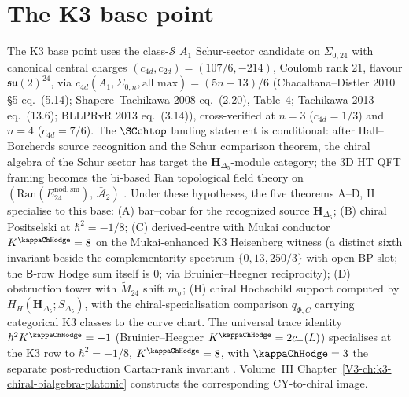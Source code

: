 \section*{The K3 base point}

The K3 base point uses the class-$\mathcal S$ \(A_1\) Schur-sector
candidate on \(\Sigma_{0,24}\) with canonical central charges
$(c_{4d}, c_{2d}) = (107/6, -214)$, Coulomb rank $21$, flavour
$\mathfrak{su}(2)^{24}$, via
$c_{4d}(A_1, \Sigma_{0,n}, \text{all max}) = (5n-13)/6$
(Chacaltana--Distler 2010 \S5 eq.~(5.14);
Shapere--Tachikawa 2008 eq.~(2.20), Table~4;
Tachikawa 2013 eq.~(13.6); BLLPRvR 2013 eq.~(3.14)),
cross-verified at $n = 3$ ($c_{4d} = 1/3$) and $n = 4$
($c_{4d} = 7/6$). The \(\SCchtop\) landing statement is conditional:
after Hall--Borcherds source recognition and the Schur comparison
theorem, the chiral algebra of the Schur sector has target the
$\mathbf H_{\Delta_5}$-module category; the $3$D HT QFT framing becomes
the bi-based Ran topological field theory on
$(\mathrm{Ran}(E^{\mathrm{nod,sm}}_{24}),\,\bar{\mathcal A}_2)$
\cite{Gaiotto2009,BeemRastelli2015}.
Under these hypotheses, the five theorems A--D, H specialise to this
base:
(A) bar--cobar for the recognized source $\mathbf H_{\Delta_5}$;
(B) chiral Positselski at $\hbar^2 = -1/8$;
(C) derived-centre with Mukai conductor $K^{\kappaChHodge} = 8$
 on the Mukai-enhanced K3 Heisenberg witness (a distinct sixth
 invariant beside the complementarity spectrum
 $\{0, 13, 250/3\}$ with open BP slot; the $\mathsf{B}$-row
 Hodge sum itself is $0$; via Bruinier--Heegner reciprocity);
(D) obstruction tower with $\widetilde M_{24}$ shift $m_\sigma$;
(H) chiral Hochschild support computed by
$H_H(\mathbf H_{\Delta_5};S_{\Delta_5})$, with the
chiral-specialisation comparison $q_{\Phi,C}$ carrying categorical
K3 classes to the curve chart.
The universal trace identity
$\hbar^2 K^{\kappaChHodge} = -1$ (Bruinier--Heegner
$K^{\kappaChHodge} = 2c_+(L)$)
specialises at the K3 row to
$\hbar^2 = -1/8$, $K^{\kappaChHodge} = 8$, with
$\kappaChHodge = 3$
the separate post-reduction Cartan-rank invariant
\cite{Mukai1987,Lusztig1990,ChengDuncanHarvey2014}.
Volume~III Chapter~\ref{V3-ch:k3-chiral-bialgebra-platonic}
constructs the corresponding CY-to-chiral image.
